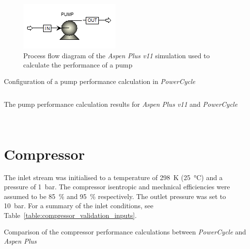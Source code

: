     \begin{figure}[H]
        \centering
        \includegraphics{Content/Appendices/Appendix_F/Figures/AspenPlus_PumpValidation.png}
        \caption{Process flow diagram of the \emph{Aspen Plus v11} simulation used to calculate the performance of a pump}
        \label{fig:Aspen_pump_validation}
    \end{figure}

    \begin{listing}[H]
        \caption{Configuration of a pump performance calculation in \emph{PowerCycle}}
        \inputminted[bgcolor=bg,linenos, fontsize=\footnotesize]{python}{Content/Appendices/Appendix_F/Code/PumpPerf_snippet.py}
        \label{lst:PC_pump_validation}
        \vspace{-20pt}
    \end{listing}

    \begin{table}[H]
        \caption{The pump performance calculation results for \emph{Aspen Plus v11} and \emph{PowerCycle}}
        \centering 
        \label{table:pump_validation_outputs}
                
        \\[10pt]
    \end{table}

\section{Compressor}
    The inlet stream was initialised to a temperature of \qty{298}{\K} (\qty{25}{\degreeCelsius}) and a pressure of \qty{1}{\bar}. The compressor isentropic and mechnical efficiencies were assumed to be \qty{85}{\percent} and \qty{95}{\percent} respectively. The outlet pressure was set to \qty{10}{\bar}. For a summary of the inlet conditions, see Table~\ref{table:compressor_validation_inputs}.

    \begin{table}[H]
        \caption{Comparison of the compressor performance calculations between \emph{PowerCycle} and \emph{Aspen Plus}}
        \centering 
        \label{table:compressor_validation_inputs}
        
        \\[10pt]
    \end{table}

